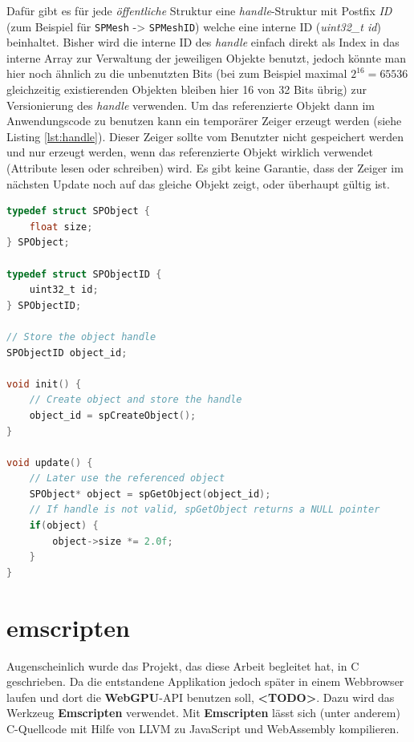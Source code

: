 \documentclass[oneside]{ausarbeitung}
\begin{document}
Dafür gibt es für jede \textit{öffentliche} Struktur eine \textit{handle}-Struktur mit Postfix \textit{ID} (zum Beispiel für \texttt{SPMesh} -> \texttt{SPMeshID}) welche eine interne ID (\textit{uint32\_t id}) beinhaltet. Bisher wird die interne ID des \textit{handle} einfach direkt als Index in das interne Array zur Verwaltung der jeweiligen Objekte benutzt, jedoch könnte man hier noch ähnlich zu \cite{weissflog:handles} die unbenutzten Bits (bei zum Beispiel maximal $2^{16} = 65536$ gleichzeitig existierenden Objekten bleiben hier 16 von 32 Bits übrig) zur Versionierung des \textit{handle} verwenden. Um das referenzierte Objekt dann im Anwendungscode zu benutzen kann ein temporärer Zeiger erzeugt werden (siehe Listing \ref{lst:handle}). Dieser Zeiger sollte vom Benutzter nicht gespeichert werden und nur erzeugt werden, wenn das referenzierte Objekt wirklich verwendet (Attribute lesen oder schreiben) wird. Es gibt keine Garantie, dass der Zeiger im nächsten Update noch auf das gleiche Objekt zeigt, oder überhaupt gültig ist.

\begin{minipage}{\textwidth}
\begin{lstlisting}[language=C, label={lst:handle}, caption={Verwendung von \textit{handles}}]
typedef struct SPObject {
	float size;
} SPObject;

typedef struct SPObjectID {
	uint32_t id;
} SPObjectID;

// Store the object handle
SPObjectID object_id;

void init() {
	// Create object and store the handle
	object_id = spCreateObject();
}

void update() {
	// Later use the referenced object
	SPObject* object = spGetObject(object_id);
	// If handle is not valid, spGetObject returns a NULL pointer
	if(object) {
		object->size *= 2.0f;
	}
}
\end{lstlisting}
\end{minipage}

\section{emscripten \cite{emscripten}}
Augenscheinlich wurde das Projekt, das diese Arbeit begleitet hat, in C geschrieben. Da die entstandene Applikation jedoch später in einem Webbrowser laufen und dort die \textbf{WebGPU}-\ac{API} benutzen soll, \textbf{<TODO>}. Dazu wird das Werkzeug \textbf{Emscripten} verwendet. Mit \textbf{Emscripten} lässt sich (unter anderem) C-Quellcode mit Hilfe von LLVM \cite{llvm} zu JavaScript und WebAssembly \cite{wasm} kompilieren.
\end{document}
